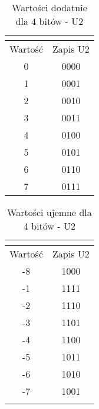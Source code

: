 \documentclass[12pt, a4paper, onside, polish]{article}				%
\begin{document}
\begin{table}[htb]
\caption{Wartości dodatnie dla 4 bitów - U2}
\centering
\begin{tabular}{cc}
\multicolumn{1}{l}{} & \multicolumn{1}{l}{} \\ \hline
\multicolumn{1}{|c|}{Wartość} & \multicolumn{1}{c|}{Zapis U2} \\ \hline
\multicolumn{1}{|c|}{0} & \multicolumn{1}{c|}{0000} \\ \hline
\multicolumn{1}{|c|}{1} & \multicolumn{1}{c|}{0001} \\ \hline
\multicolumn{1}{|c|}{2} & \multicolumn{1}{c|}{0010} \\ \hline
\multicolumn{1}{|c|}{3} & \multicolumn{1}{c|}{0011} \\ \hline
\multicolumn{1}{|c|}{4} & \multicolumn{1}{c|}{0100} \\ \hline
\multicolumn{1}{|c|}{5} & \multicolumn{1}{c|}{0101} \\ \hline
\multicolumn{1}{|c|}{6} & \multicolumn{1}{c|}{0110} \\ \hline
\multicolumn{1}{|c|}{7} & \multicolumn{1}{c|}{0111} \\ \hline
\end{tabular}
\end{table}

\begin{table}[htb]
\caption{Wartości ujemne dla 4 bitów - U2}
\centering
\begin{tabular}{cc}
\multicolumn{1}{l}{} & \multicolumn{1}{l}{} \\ \hline
\multicolumn{1}{|c|}{Wartość} & \multicolumn{1}{c|}{Zapis U2} \\ \hline
\multicolumn{1}{|c|}{-8} & \multicolumn{1}{c|}{1000} \\ \hline
\multicolumn{1}{|c|}{-1} & \multicolumn{1}{c|}{1111} \\ \hline
\multicolumn{1}{|c|}{-2} & \multicolumn{1}{c|}{1110} \\ \hline
\multicolumn{1}{|c|}{-3} & \multicolumn{1}{c|}{1101} \\ \hline
\multicolumn{1}{|c|}{-4} & \multicolumn{1}{c|}{1100} \\ \hline
\multicolumn{1}{|c|}{-5} & \multicolumn{1}{c|}{1011} \\ \hline
\multicolumn{1}{|c|}{-6} & \multicolumn{1}{c|}{1010} \\ \hline
\multicolumn{1}{|c|}{-7} & \multicolumn{1}{c|}{1001} \\ \hline
\multicolumn{1}{l}{} & \multicolumn{1}{l}{}
\end{tabular}
\end{table}
\end{document}
